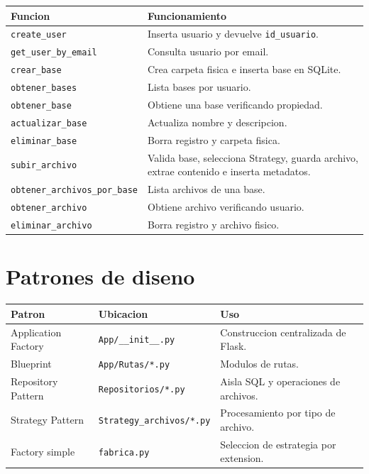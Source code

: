 \documentclass[12pt,a4paper]{article}
\begin{document}
\begin{longtable}{|p{5cm}|p{10cm}|}
\hline
\textbf{Funcion} & \textbf{Funcionamiento} \\
\hline
\texttt{create\_user} & Inserta usuario y devuelve \texttt{id\_usuario}. \\
\hline
\texttt{get\_user\_by\_email} & Consulta usuario por email. \\
\hline
\texttt{crear\_base} & Crea carpeta fisica e inserta base en SQLite. \\
\hline
\texttt{obtener\_bases} & Lista bases por usuario. \\
\hline
\texttt{obtener\_base} & Obtiene una base verificando propiedad. \\
\hline
\texttt{actualizar\_base} & Actualiza nombre y descripcion. \\
\hline
\texttt{eliminar\_base} & Borra registro y carpeta fisica. \\
\hline
\texttt{subir\_archivo} & Valida base, selecciona Strategy, guarda archivo, extrae contenido e inserta metadatos. \\
\hline
\texttt{obtener\_archivos\_por\_base} & Lista archivos de una base. \\
\hline
\texttt{obtener\_archivo} & Obtiene archivo verificando usuario. \\
\hline
\texttt{eliminar\_archivo} & Borra registro y archivo fisico. \\
\hline
\end{longtable}

\section{Patrones de diseno}

\begin{longtable}{|p{4cm}|p{5cm}|p{7cm}|}
\hline
\textbf{Patron} & \textbf{Ubicacion} & \textbf{Uso} \\
\hline
Application Factory & \texttt{App/\_\_init\_\_.py} & Construccion centralizada de Flask. \\
\hline
Blueprint & \texttt{App/Rutas/*.py} & Modulos de rutas. \\
\hline
Repository Pattern & \texttt{Repositorios/*.py} & Aisla SQL y operaciones de archivos. \\
\hline
Strategy Pattern & \texttt{Strategy\_archivos/*.py} & Procesamiento por tipo de archivo. \\
\hline
Factory simple & \texttt{fabrica.py} & Seleccion de estrategia por extension. \\
\hline
\end{longtable}
\end{document}
